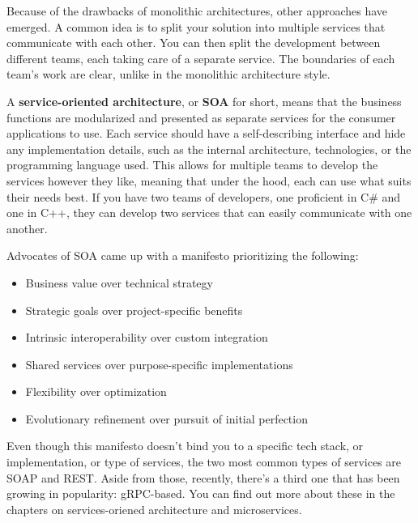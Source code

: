 
Because of the drawbacks of monolithic architectures, other approaches have emerged. A common idea is to split your solution into multiple services that communicate with each other. You can then split the development between different teams, each taking care of a separate service. The boundaries of each team's work are clear, unlike in the monolithic architecture style.

A \textbf{service-oriented architecture}, or \textbf{SOA} for short, means that the business functions are modularized and presented as separate services for the consumer applications to use. Each service should have a self-describing interface and hide any implementation details, such as the internal architecture, technologies, or the programming language used. This allows for multiple teams to develop the services however they like, meaning that under the hood, each can use what suits their needs best. If you have two teams of developers, one proficient in C\# and one in C++, they can develop two services that can easily communicate with one another.

Advocates of SOA came up with a manifesto prioritizing the following:


\begin{itemize}
\item
Business value over technical strategy

\item
Strategic goals over project-specific benefits

\item
Intrinsic interoperability over custom integration

\item
Shared services over purpose-specific implementations

\item
Flexibility over optimization

\item
Evolutionary refinement over pursuit of initial perfection
\end{itemize}

Even though this manifesto doesn't bind you to a specific tech stack, or implementation, or type of services, the two most common types of services are SOAP and REST. Aside from those, recently, there's a third one that has been growing in popularity: gRPC-based. You can find out more about these in the chapters on services-oriened architecture and microservices.


